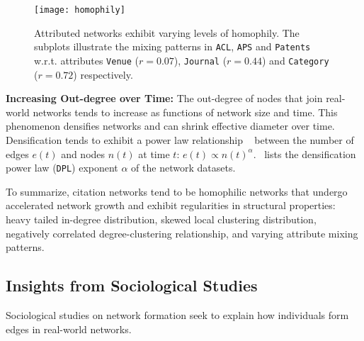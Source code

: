 
\begin{figure}
 \centering
 \texttt{[image: homophily]}
 \caption{
    Attributed networks exhibit varying levels of homophily. The subplots
    illustrate the mixing patterns in \texttt{ACL}, \texttt{APS} and \texttt{Patents}
    w.r.t. attributes \texttt{Venue} ($r=0.07$), \texttt{Journal} ($r=0.44$) and
    \texttt{Category} ($r=0.72$) respectively.
 }
 \label{fig:mixing}
 \vspace{-15pt}
\end{figure}

\textbf{Increasing Out-degree over Time:}
The out-degree of nodes that join real-world networks tends to increase as
functions of network size and time. This phenomenon densifies networks and
can shrink effective diameter over time. Densification tends to exhibit a power law
relationship ~\cite{leskovec2005graphs} between the number of edges $e(t)$ and
nodes $n(t)$ at time $t$: $e(t) \propto n(t)^{\alpha}$.~
lists the densification power law (\texttt{DPL}) exponent $\alpha$ of the
network datasets.

To summarize, citation networks tend to be homophilic networks that undergo
accelerated network growth and exhibit regularities in structural properties:
heavy tailed in-degree distribution, skewed local clustering distribution,
negatively correlated degree-clustering relationship, and varying attribute
mixing patterns.



\subsection{Insights from Sociological Studies}

Sociological studies on network formation seek to explain
how individuals form edges in real-world networks.

